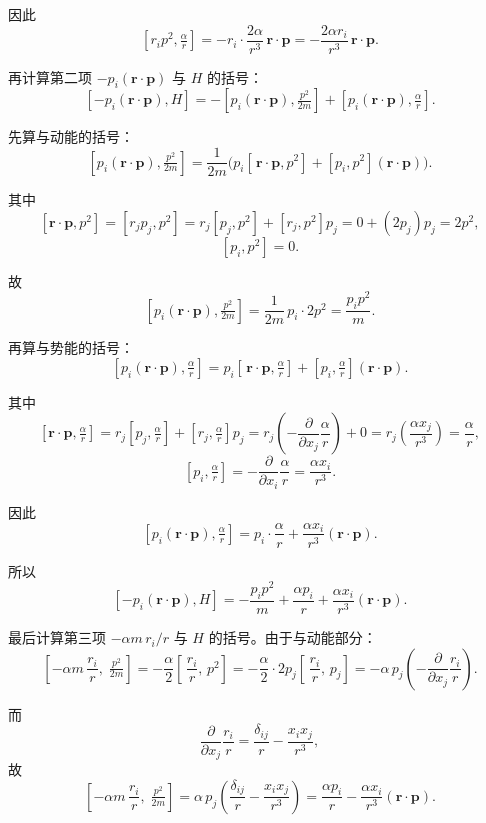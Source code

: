 \begin{question}
\begin{solution}
因此
\[
[r_i p^2, \tfrac{\alpha}{r}] = -r_i\cdot \frac{2\alpha}{r^3}\,\boldsymbol r\!\cdot\!\boldsymbol p
= -\frac{2\alpha r_i}{r^3}\,\boldsymbol r\!\cdot\!\boldsymbol p.
\]

再计算第二项 \(-p_i(\boldsymbol r\!\cdot\!\boldsymbol p)\) 与 \(H\) 的括号：
\[
[-p_i(\boldsymbol r\!\cdot\!\boldsymbol p), H]
= -[p_i(\boldsymbol r\!\cdot\!\boldsymbol p), \tfrac{p^2}{2m}]
+ [p_i(\boldsymbol r\!\cdot\!\boldsymbol p), \tfrac{\alpha}{r}].

\]

先算与动能的括号：
\[
[p_i(\boldsymbol r\!\cdot\!\boldsymbol p), \tfrac{p^2}{2m}]
= \frac{1}{2m}\bigl(p_i[\,\boldsymbol r\!\cdot\!\boldsymbol p, p^2] + [p_i,p^2](\boldsymbol r\!\cdot\!\boldsymbol p)\bigr).
\]

其中
\[
[\boldsymbol r\!\cdot\!\boldsymbol p, p^2] = [r_jp_j, p^2]
= r_j[p_j,p^2] + [r_j,p^2]p_j
= 0 + (2p_j)p_j = 2p^2,
\]
\[
[p_i, p^2] = 0.
\]

故
\[
[p_i(\boldsymbol r\!\cdot\!\boldsymbol p), \tfrac{p^2}{2m}]
= \frac{1}{2m}\,p_i\cdot 2p^2 = \frac{p_i p^2}{m}.
\]

再算与势能的括号：
\[
[p_i(\boldsymbol r\!\cdot\!\boldsymbol p), \tfrac{\alpha}{r}]
= p_i[\,\boldsymbol r\!\cdot\!\boldsymbol p, \tfrac{\alpha}{r}]
+ [p_i,\tfrac{\alpha}{r}](\boldsymbol r\!\cdot\!\boldsymbol p).
\]

其中
\[
[\boldsymbol r\!\cdot\!\boldsymbol p, \tfrac{\alpha}{r}]
= r_j[p_j,\tfrac{\alpha}{r}] + [r_j,\tfrac{\alpha}{r}]p_j
= r_j\!\left(-\frac{\partial}{\partial x_j}\frac{\alpha}{r}\right) + 0
= r_j\!\left(\frac{\alpha x_j}{r^3}\right)
= \frac{\alpha}{r},
\]
\[
[p_i,\tfrac{\alpha}{r}] = -\frac{\partial}{\partial x_i}\frac{\alpha}{r}
= \frac{\alpha x_i}{r^3}.
\]

因此
\[
[p_i(\boldsymbol r\!\cdot\!\boldsymbol p), \tfrac{\alpha}{r}]
= p_i\cdot\frac{\alpha}{r} + \frac{\alpha x_i}{r^3}(\boldsymbol r\!\cdot\!\boldsymbol p).
\]

所以
\[
[-p_i(\boldsymbol r\!\cdot\!\boldsymbol p), H] = -\frac{p_i p^2}{m}
+ \frac{\alpha p_i}{r} + \frac{\alpha x_i}{r^3}(\boldsymbol r\!\cdot\!\boldsymbol p).
\]

最后计算第三项 \(-\alpha m\, r_i/r\) 与 \(H\) 的括号。由于与动能部分：
\[
[-\alpha m\,\frac{r_i}{r},\; \tfrac{p^2}{2m}]
= -\frac{\alpha}{2}[\,\frac{r_i}{r},\, p^2]
= -\frac{\alpha}{2}\cdot 2p_j[\,\frac{r_i}{r},\, p_j]
= -\alpha\,p_j\!\left(-\frac{\partial}{\partial x_j}\frac{r_i}{r}\right).
\]

而
\[
\frac{\partial}{\partial x_j}\frac{r_i}{r}
= \frac{\delta_{ij}}{r} - \frac{x_i x_j}{r^3},
\]
故
\[
[-\alpha m\,\frac{r_i}{r},\; \tfrac{p^2}{2m}]
= \alpha\,p_j\!\left(\frac{\delta_{ij}}{r} - \frac{x_i x_j}{r^3}\right)
= \frac{\alpha p_i}{r} - \frac{\alpha x_i}{r^3}(\boldsymbol r\!\cdot\!\boldsymbol p).
\]


\end{solution}
\end{question}
